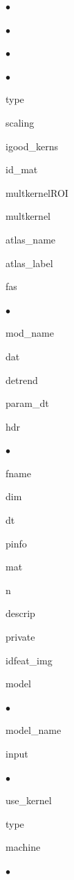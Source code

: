 \begin{list}{$\bullet$}
\begin{list}{$\bullet$}
\begin{list}{$\bullet$}
\begin{list}{$\bullet$}
	{\setlength{\labelsep}{.2cm}\setlength{\itemindent}{0cm}\setlength{\leftmargin}{1.7cm}}
\item type
\item scaling
\end{list}
\item igood\_kerns
\end{list}
\item id\_mat
\item multkernelROI
\item multkernel
\item atlas\_name
\item atlas\_label
\end{list}
\item fas
\begin{list}{$\bullet$}
	{\setlength{\labelsep}{.2cm}\setlength{\itemindent}{0cm}\setlength{\leftmargin}{0.7cm}}
\item mod\_name
\item dat
\item detrend
\item param\_dt
\item hdr
\begin{list}{$\bullet$}
	{\setlength{\labelsep}{.2cm}\setlength{\itemindent}{0cm}\setlength{\leftmargin}{1.2cm}}
\item fname
\item dim
\item dt
\item pinfo
\item mat
\item n
\item descrip
\item private
\end{list}
\item idfeat\_img
\end{list}
\item model
\begin{list}{$\bullet$}
	{\setlength{\labelsep}{.2cm}\setlength{\itemindent}{0cm}\setlength{\leftmargin}{0.7cm}}
\item model\_name
\item input
\begin{list}{$\bullet$}
	{\setlength{\labelsep}{.2cm}\setlength{\itemindent}{0cm}\setlength{\leftmargin}{1.2cm}}
\item use\_kernel
\item type
\item machine
\begin{list}{$\bullet$}
	{\setlength{\labelsep}{.2cm}\setlength{\itemindent}{0cm}\setlength{\leftmargin}{1.7cm}}

\end{list}
\end{list}
\end{list}
\end{list}
